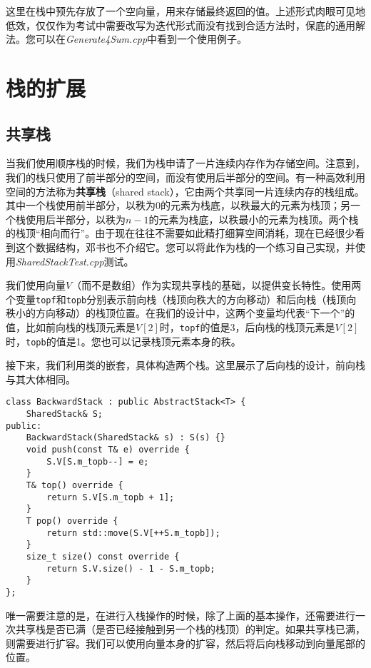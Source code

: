 这里在栈中预先存放了一个空向量，用来存储最终返回的值。上述形式肉眼可见地低效，仅仅作为考试中需要改写为迭代形式而没有找到合适方法时，保底的通用解法。您可以在\textit{Generate4Sum.cpp}中看到一个使用例子。

\section{栈的扩展}

\subsection{共享栈}

当我们使用顺序栈的时候，我们为栈申请了一片连续内存作为存储空间。注意到，我们的栈只使用了前半部分的空间，而没有使用后半部分的空间。有一种高效利用空间的方法称为\textbf{共享栈}（shared stack），它由两个共享同一片连续内存的栈组成。其中一个栈使用前半部分，以秩为0的元素为栈底，以秩最大的元素为栈顶；另一个栈使用后半部分，以秩为$n-1$的元素为栈底，以秩最小的元素为栈顶。两个栈的栈顶“相向而行”。由于现在往往不需要如此精打细算空间消耗，现在已经很少看到这个数据结构，邓书也不介绍它。您可以将此作为栈的一个练习自己实现，并使用\textit{SharedStackTest.cpp}测试。

我们使用向量$V$（而不是数组）作为实现共享栈的基础，以提供变长特性。使用两个变量\lstinline{topf}和\lstinline{topb}分别表示前向栈（栈顶向秩大的方向移动）和后向栈（栈顶向秩小的方向移动）的栈顶位置。在我们的设计中，这两个变量均代表“下一个”的值，比如前向栈的栈顶元素是$V[2]$时，\lstinline{topf}的值是3，后向栈的栈顶元素是$V[2]$时，\lstinline{topb}的值是1。您也可以记录栈顶元素本身的秩。

接下来，我们利用类的嵌套，具体构造两个栈。这里展示了后向栈的设计，前向栈与其大体相同。

\begin{lstlisting}
class BackwardStack : public AbstractStack<T> {
    SharedStack& S;
public:
    BackwardStack(SharedStack& s) : S(s) {}
    void push(const T& e) override {
        S.V[S.m_topb--] = e;
    }
    T& top() override {
        return S.V[S.m_topb + 1];
    }
    T pop() override {
        return std::move(S.V[++S.m_topb]);
    }
    size_t size() const override {
        return S.V.size() - 1 - S.m_topb;
    }
};
\end{lstlisting}

唯一需要注意的是，在进行入栈操作的时候，除了上面的基本操作，还需要进行一次共享栈是否已满（是否已经接触到另一个栈的栈顶）的判定。如果共享栈已满，则需要进行扩容。我们可以使用向量本身的扩容，然后将后向栈移动到向量尾部的位置。


